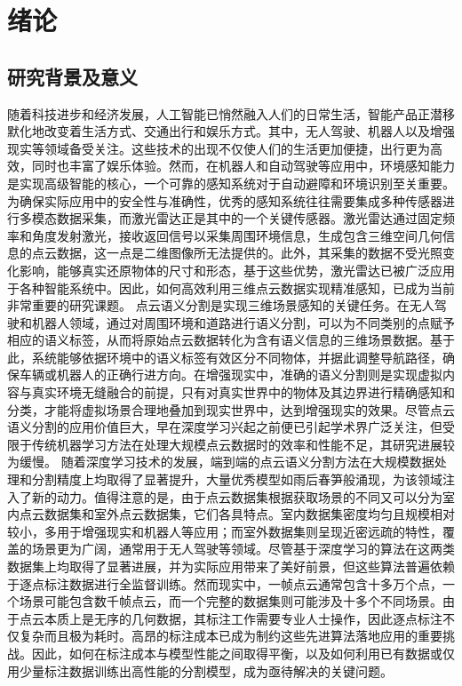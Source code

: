 \chapter{绪论}
\thispagestyle{others}
\pagestyle{others}
\xiaosi

\section{研究背景及意义}
    随着科技进步和经济发展，人工智能已悄然融入人们的日常生活，智能产品正潜移默化地改变着生活方式、交通出行和娱乐方式。其中，无人驾驶、机器人以及增强现实等领域备受关注。这些技术的出现不仅使人们的生活更加便捷，出行更为高效，同时也丰富了娱乐体验。然而，在机器人和自动驾驶等应用中，环境感知能力是实现高级智能的核心，一个可靠的感知系统对于自动避障和环境识别至关重要。为确保实际应用中的安全性与准确性，优秀的感知系统往往需要集成多种传感器进行多模态数据采集，而激光雷达正是其中的一个关键传感器。激光雷达通过固定频率和角度发射激光，接收返回信号以采集周围环境信息，生成包含三维空间几何信息的点云数据，这一点是二维图像所无法提供的。此外，其采集的数据不受光照变化影响，能够真实还原物体的尺寸和形态，基于这些优势，激光雷达已被广泛应用于各种智能系统中。因此，如何高效利用三维点云数据实现精准感知，已成为当前非常重要的研究课题。
    点云语义分割是实现三维场景感知的关键任务。在无人驾驶和机器人领域，通过对周围环境和道路进行语义分割，可以为不同类别的点赋予相应的语义标签，从而将原始点云数据转化为含有语义信息的三维场景数据。基于此，系统能够依据环境中的语义标签有效区分不同物体，并据此调整导航路径，确保车辆或机器人的正确行进方向。在增强现实中，准确的语义分割则是实现虚拟内容与真实环境无缝融合的前提，只有对真实世界中的物体及其边界进行精确感知和分类，才能将虚拟场景合理地叠加到现实世界中，达到增强现实的效果。尽管点云语义分割的应用价值巨大，早在深度学习兴起之前便已引起学术界广泛关注，但受限于传统机器学习方法在处理大规模点云数据时的效率和性能不足，其研究进展较为缓慢。
    随着深度学习技术的发展，端到端的点云语义分割方法在大规模数据处理和分割精度上均取得了显著提升，大量优秀模型如雨后春笋般涌现，为该领域注入了新的动力。值得注意的是，由于点云数据集根据获取场景的不同又可以分为室内点云数据集和室外点云数据集，它们各具特点。室内数据集密度均匀且规模相对较小，多用于增强现实和机器人等应用；而室外数据集则呈现近密远疏的特性，覆盖的场景更为广阔，通常用于无人驾驶等领域。尽管基于深度学习的算法在这两类数据集上均取得了显著进展，并为实际应用带来了美好前景，但这些算法普遍依赖于逐点标注数据进行全监督训练。然而现实中，一帧点云通常包含十多万个点，一个场景可能包含数千帧点云，而一个完整的数据集则可能涉及十多个不同场景。由于点云本质上是无序的几何数据，其标注工作需要专业人士操作，因此逐点标注不仅复杂而且极为耗时。高昂的标注成本已成为制约这些先进算法落地应用的重要挑战。因此，如何在标注成本与模型性能之间取得平衡，以及如何利用已有数据或仅用少量标注数据训练出高性能的分割模型，成为亟待解决的关键问题。
